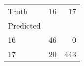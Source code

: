 \begin{tabular}{lrr}
\toprule
Truth & 16 & 17 \\
Predicted &  &  \\
\midrule
16 & 46 & 0 \\
17 & 20 & 443 \\
\bottomrule
\end{tabular}
